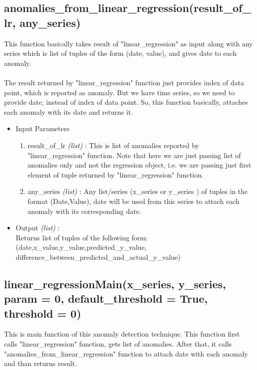 \subsection{anomalies\_from\_linear\_regression(result\_of\_lr, any\_series)}

This function basically takes result of "linear\_regression" as input along with 
any series which is list of tuples of the form (date, value), and gives date to 
each anomaly. \\
\\
The result returned by "linear\_regression" function just provides index of data 
point, which is reported as anomaly. But we have time series, so we need to 
provide date, instead of index of data point. So, this function basically, 
attaches each anomaly with its date and returns it.

\begin{itemize}
 \item Input Parameters
 
 \begin{enumerate}
  \item result\_of\_lr \textit{(list)} : This is list of anomalies reported by 
"linear\_regression" function. Note that here we are just passing list of 
anomalies only and not the regression object, i.e. we are passing just first 
element of tuple returned by "linear\_regression" function.
  \item any\_series \textit{(list)} : Any list/series (x\_series or y\_series ) 
of tuples in the format (Date,Value), date will be used from this series to 
attach each anomaly with its corresponding date.
 \end{enumerate}

 \item Output \textit{(list)} : \\
 	Returns list of tuples of the following form: \\ 
 	
(date,x\_value,y\_value,predicted\_y\_value,
difference\_between\_predicted\_and\_actual\_y\_value)

\end{itemize}

\subsection{linear\_regressionMain(x\_series, y\_series, param = 0, 
default\_threshold = True, threshold = 0)}

This is main function of this anomaly detection technique. This function first 
calls "linear\_regression" function, gets list of anomalies. After that, it 
calls "anomalies\_from\_linear\_regression" function to attach date with each 
anomaly and than returns result.

